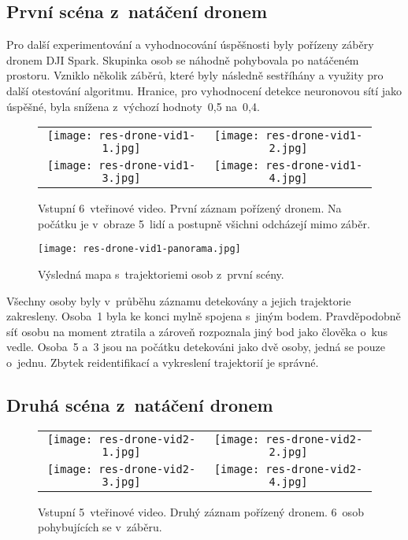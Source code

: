 \subsection*{První scéna z~natáčení dronem}

Pro další experimentování a vyhodnocování úspěšnosti byly pořízeny záběry dronem DJI Spark. Skupinka osob se náhodně pohybovala po natáčeném prostoru. Vzniklo několik záběrů, které byly následně sestříhány a využity pro další otestování algoritmu. Hranice, pro vyhodnocení detekce neuronovou sítí jako úspěšné, byla snížena z~výchozí hodnoty~0,5 na~0,4.

\begin{figure}[H]
    \begin{tabular}{cc}
        \texttt{[image: res-drone-vid1-1.jpg]} &
        \texttt{[image: res-drone-vid1-2.jpg]} \\
        \texttt{[image: res-drone-vid1-3.jpg]} &
        \texttt{[image: res-drone-vid1-4.jpg]} \\
    \end{tabular}
    \caption[Otestování algoritmu na prvním záznamu z~dronu]{Vstupní 6~vteřinové video. První záznam pořízený dronem. Na počátku je v~obraze 5~lidí a postupně všichni odcházejí mimo záběr.}
\end{figure}

\begin{figure}[H]
    \centering
    \texttt{[image: res-drone-vid1-panorama.jpg]}
    \caption[Výsledná mapa s~trajektoriemi osob z~první scény]{Výsledná mapa s~trajektoriemi osob z~první scény.}
\end{figure}

Všechny osoby byly v~průběhu záznamu detekovány a jejich trajektorie zakresleny. Osoba~1 byla ke konci mylně spojena s~jiným bodem. Pravděpodobně síť osobu na moment ztratila a zároveň rozpoznala jiný bod jako člověka o~kus vedle. Osoba~5 a~3 jsou na počátku detekováni jako dvě osoby, jedná se pouze o~jednu. Zbytek reidentifikací a vykreslení trajektorií je správné.


\subsection*{Druhá scéna z~natáčení dronem}

\begin{figure}[H]
    \begin{tabular}{cc}
        \texttt{[image: res-drone-vid2-1.jpg]} &
        \texttt{[image: res-drone-vid2-2.jpg]} \\
        \texttt{[image: res-drone-vid2-3.jpg]} &
        \texttt{[image: res-drone-vid2-4.jpg]} \\
    \end{tabular}
    \caption[Otestování algoritmu na druhém záznamu z~dronu]{Vstupní 5~vteřinové video. Druhý záznam pořízený dronem. 6~osob pohybujících se v~záběru.}
\end{figure}

